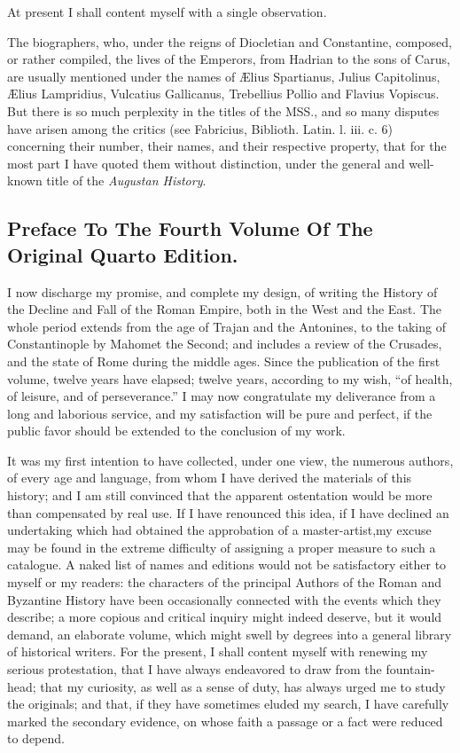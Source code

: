 At present I shall content myself with a single observation.

The biographers, who, under the reigns of Diocletian and Constantine, composed, or rather compiled, the lives of the Emperors, from Hadrian to the sons of Carus, are usually mentioned under the names of Ælius Spartianus, Julius Capitolinus, Ælius Lampridius, Vulcatius Gallicanus, Trebellius Pollio and Flavius Vopiscus. But there is so much perplexity in the titles of the MSS., and so many disputes have arisen among the critics (see Fabricius, Biblioth. Latin. l. iii. c. 6) concerning their number, their names, and their respective property, that for the most part I have quoted them without distinction, under the general and well-known title of the \textit{Augustan History}.


\subsection{Preface To The Fourth Volume Of The Original Quarto Edition.}

I now discharge my promise, and complete my design, of writing the History of the Decline and Fall of the Roman Empire, both in the West and the East. The whole period extends from the age of Trajan and the Antonines, to the taking of Constantinople by Mahomet the Second; and includes a review of the Crusades, and the state of Rome during the middle ages. Since the publication of the first volume, twelve years have elapsed; twelve years, according to my wish, “of health, of leisure, and of perseverance.” I may now congratulate my deliverance from a long and laborious service, and my satisfaction will be pure and perfect, if the public favor should be extended to the conclusion of my work.

It was my first intention to have collected, under one view, the numerous authors, of every age and language, from whom I have derived the materials of this history; and I am still convinced that the apparent ostentation would be more than compensated by real use. If I have renounced this idea, if I have declined an undertaking which had obtained the approbation of a master-artist,\footnotemark[4] my excuse may be found in the extreme difficulty of assigning a proper measure to such a catalogue. A naked list of names and editions would not be satisfactory either to myself or my readers: the characters of the principal Authors of the Roman and Byzantine History have been occasionally connected with the events which they describe; a more copious and critical inquiry might indeed deserve, but it would demand, an elaborate volume, which might swell by degrees into a general library of historical writers. For the present, I shall content myself with renewing my serious protestation, that I have always endeavored to draw from the fountain-head; that my curiosity, as well as a sense of duty, has always urged me to study the originals; and that, if they have sometimes eluded my search, I have carefully marked the secondary evidence, on whose faith a passage or a fact were reduced to depend.

